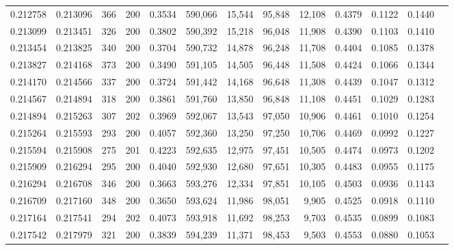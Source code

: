 \begin{tabular}{rrrrrrrrrrrrr}
0.212758 & 0.213096 &   366 & 200 &                                     0.3534 & 590,066 &  15,544 &  95,848 &  12,108 & 0.4379 & 0.1122 & 0.1440 \\
0.213099 & 0.213451 &   326 & 200 &                                     0.3802 & 590,392 &  15,218 &  96,048 &  11,908 & 0.4390 & 0.1103 & 0.1410 \\
0.213454 & 0.213825 &   340 & 200 &                                     0.3704 & 590,732 &  14,878 &  96,248 &  11,708 & 0.4404 & 0.1085 & 0.1378 \\
0.213827 & 0.214168 &   373 & 200 &                                     0.3490 & 591,105 &  14,505 &  96,448 &  11,508 & 0.4424 & 0.1066 & 0.1344 \\
0.214170 & 0.214566 &   337 & 200 &                                     0.3724 & 591,442 &  14,168 &  96,648 &  11,308 & 0.4439 & 0.1047 & 0.1312 \\
0.214567 & 0.214894 &   318 & 200 &                                     0.3861 & 591,760 &  13,850 &  96,848 &  11,108 & 0.4451 & 0.1029 & 0.1283 \\
0.214894 & 0.215263 &   307 & 202 &                                     0.3969 & 592,067 &  13,543 &  97,050 &  10,906 & 0.4461 & 0.1010 & 0.1254 \\
0.215264 & 0.215593 &   293 & 200 &                                     0.4057 & 592,360 &  13,250 &  97,250 &  10,706 & 0.4469 & 0.0992 & 0.1227 \\
0.215594 & 0.215908 &   275 & 201 &                                     0.4223 & 592,635 &  12,975 &  97,451 &  10,505 & 0.4474 & 0.0973 & 0.1202 \\
0.215909 & 0.216294 &   295 & 200 &                                     0.4040 & 592,930 &  12,680 &  97,651 &  10,305 & 0.4483 & 0.0955 & 0.1175 \\
0.216294 & 0.216708 &   346 & 200 &                                     0.3663 & 593,276 &  12,334 &  97,851 &  10,105 & 0.4503 & 0.0936 & 0.1143 \\
0.216709 & 0.217160 &   348 & 200 &                                     0.3650 & 593,624 &  11,986 &  98,051 &   9,905 & 0.4525 & 0.0918 & 0.1110 \\
0.217164 & 0.217541 &   294 & 202 &                                     0.4073 & 593,918 &  11,692 &  98,253 &   9,703 & 0.4535 & 0.0899 & 0.1083 \\
0.217542 & 0.217979 &   321 & 200 &                                     0.3839 & 594,239 &  11,371 &  98,453 &   9,503 & 0.4553 & 0.0880 & 0.1053 \\

\end{tabular}

